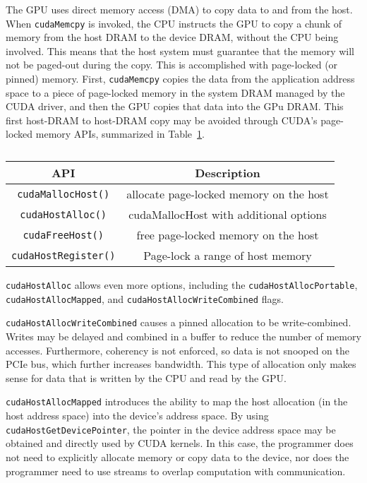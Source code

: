 The GPU uses direct memory access (DMA) to copy data to and from the host.
When \texttt{cudaMemcpy} is invoked, the CPU instructs the GPU to copy a chunk of memory from the host DRAM to the device DRAM, without the CPU being involved.
This means that the host system must guarantee that the memory will not be paged-out during the copy.
This is accomplished with page-locked (or pinned) memory.
First, \texttt{cudaMemcpy} copies the data from the application address space to a piece of page-locked memory in the system DRAM managed by the CUDA driver, and then the GPU copies that data into the GPu DRAM.
This first host-DRAM to host-DRAM copy may be avoided through CUDA's page-locked memory APIs, summarized in Table~\ref{tab:cuda-pinned-apis}.

\begin{table}[h]
    \centering
    \caption[CUDA Pinned Memory-Management APIs]{}
    \label{tab:cuda-pinned-apis}
    \begin{tabular}{|c|c|}
    \hline
    \textbf{API}                & \textbf{Description} \\ \hline
    \texttt{cudaMallocHost()}   & allocate page-locked memory on the host\\ \hline
    \texttt{cudaHostAlloc()}    & cudaMallocHost with additional options \\ \hline
    \texttt{cudaFreeHost()}     & free page-locked memory on the host\\ \hline
    \texttt{cudaHostRegister()} & Page-lock a range of host memory \\ \hline
    \end{tabular}
\end{table}

\texttt{cudaHostAlloc} allows even more options, including the \texttt{cudaHostAllocPortable}, \texttt{cudaHostAllocMapped}, and \texttt{cudaHostAllocWriteCombined} flags.

\texttt{cudaHostAllocWriteCombined} causes a pinned allocation to be write-combined.
Writes may be delayed and combined in a buffer to reduce the number of memory accesses.
Furthermore, coherency is not enforced, so data is not snooped on the PCIe bus, which further increases bandwidth.
This type of allocation only makes sense for data that is written by the CPU and read by the GPU.


\texttt{cudaHostAllocMapped} introduces the ability to map the host allocation (in the host address space) into the device's address space.
By using \texttt{cudaHostGetDevicePointer}, the pointer in the device address space may be obtained and directly used by CUDA kernels.
In this case, the programmer does not need to explicitly allocate memory or copy data to the device, nor does the programmer need to use streams to overlap computation with communication.


